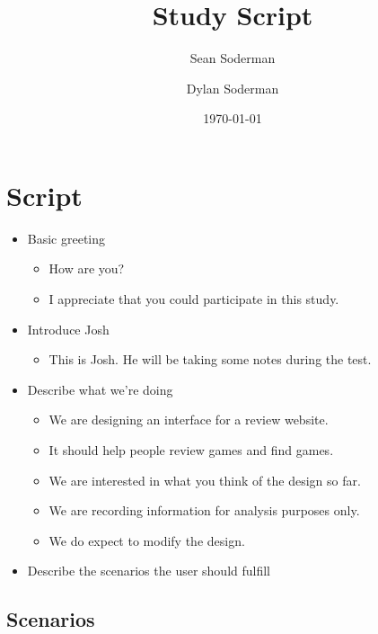 \documentclass[11pt]{extarticle}
\begin{document}
\title{Study Script}
\author{Sean Soderman\\ 
        \and
        Dylan Soderman
}
\date{\today}
\maketitle

\section*{Script}
\begin{itemize}
   \item Basic greeting
      \begin{itemize}
      \item How are you?
      \item I appreciate that you could participate in this study.
      \end{itemize}
\end{itemize}
\begin{itemize}
   \item Introduce Josh
      \begin{itemize}
      \item This is Josh. He will be taking some notes during the test.
      \end{itemize}
\end{itemize}
\begin{itemize}
   \item Describe what we're doing
      \begin{itemize}
      \item We are designing an interface for a review website.
      \item It should help people review games and find games.
      \item We are interested in what you think of the design so far.
      \item We are recording information for analysis purposes only.
      \item We do expect to modify the design.
      \end{itemize}
\end{itemize}
\begin{itemize}
   \item Describe the scenarios the user should fulfill
\end{itemize}
\subsection*{Scenarios}
\end{document}

